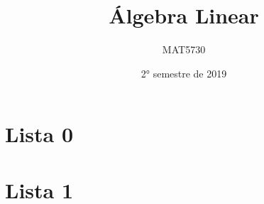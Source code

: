 \documentclass[11pt,a4paper]{article}
\title{Álgebra Linear}
\author{MAT5730}
\date{2° semestre de 2019}
\begin{document}
\maketitle
\tableofcontents
\newpage
\begin{comment}

\begin{center}
\large\textbf{\textcolor{Floresta}{Lista 1}}\\
\end{center}

\end{comment}

\section{\textcolor{Floresta}{Lista 0}}




\newpage
\section{\textcolor{Floresta}{Lista 1}}
\end{document}
